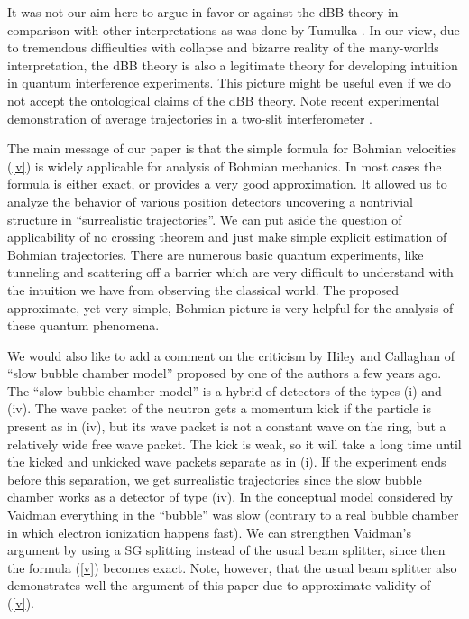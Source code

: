 \documentclass[preprint,tightenlines]{elsarticle}
\begin{document}
It was not our aim here to argue in favor or against the dBB theory
in comparison with other interpretations as was done by Tumulka \cite{tumulka:1220}. In our view, due to tremendous difficulties
with collapse and bizarre reality of the many-worlds interpretation,
the dBB theory is also a  legitimate theory for developing intuition in quantum interference
experiments.   This picture might be useful even if we
do not accept the ontological claims of the dBB theory. Note recent experimental demonstration of average trajectories in a two-slit interferometer \cite{Steinberg2011}.

 The main message
of our paper is that the simple formula for Bohmian velocities (\ref{v})
is widely applicable for analysis of Bohmian mechanics. In most cases the formula is
either exact, or provides a very good approximation. It allowed us to analyze
the behavior of various position detectors uncovering a nontrivial
structure in ``surrealistic trajectories''.  We can
put aside the question of applicability of no crossing
theorem and just make simple explicit   estimation of Bohmian trajectories.
There are numerous basic quantum experiments, like tunneling and scattering off a barrier
which are very difficult to understand with the intuition we have
from observing the classical world. The proposed approximate, yet very simple, Bohmian picture
is very helpful for the analysis of these quantum phenomena.



We would also like to add a comment on the criticism   by Hiley and Callaghan \cite{hiley2006delayed} of ``slow bubble
chamber model'' \cite{kill} proposed by one of the authors a few years ago.
The ``slow bubble chamber model'' is a hybrid of detectors of
the types (i) and (iv). The wave packet of the neutron gets a momentum
kick if the particle is present as in (iv), but its wave packet is
not a constant wave on the ring, but a relatively wide free wave packet.
The kick is weak, so it will take a long time until the kicked and
unkicked wave packets separate as in (i). If the experiment ends before
this separation, we get surrealistic trajectories since the slow bubble
chamber works as a detector of type (iv). In the conceptual model
considered by Vaidman \cite{kill} everything in the ``bubble'' was slow
(contrary to a real bubble chamber in which electron ionization happens
fast). We can strengthen Vaidman's argument  by using a SG splitting
instead of the usual beam splitter, since then the formula (\ref{v}) becomes exact.
Note, however, that the usual beam splitter also demonstrates well the argument of
this paper due to approximate validity of  (\ref{v}).
\end{document}
